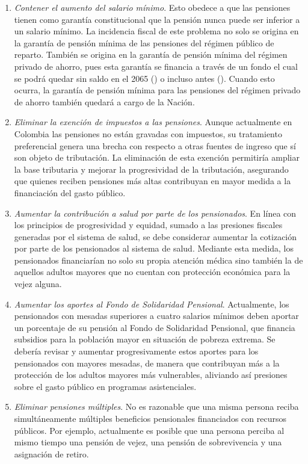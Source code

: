 \begin{enumerate}  
    \item \textit{Contener el aumento del salario mínimo}. Esto obedece a que las pensiones tienen como garantía constitucional que la pensión nunca puede ser inferior a un salario mínimo. La incidencia fiscal de este problema no solo se origina en la garantía de pensión mínima de las pensiones del régimen público de reparto. También se origina en la garantía de pensión mínima del régimen privado de ahorro, pues esta garantía se financia a través de un fondo el cual se podrá quedar sin saldo en el 2065 (\cite{Becerra2022}) o incluso antes (\cite{InformeFGPM2013}). Cuando esto ocurra, la garantía de pensión mínima para las pensiones del régimen privado de ahorro también quedará a cargo de la Nación.  
    
    \item \textit{Eliminar la exención de impuestos a las pensiones}. Aunque actualmente en Colombia las pensiones no están gravadas con impuestos, su tratamiento preferencial genera una brecha con respecto a otras fuentes de ingreso que sí son objeto de tributación. La eliminación de esta exención permitiría ampliar la base tributaria y mejorar la progresividad de la tributación, asegurando que quienes reciben pensiones más altas contribuyan en mayor medida a la financiación del gasto público.  
    
    \item \textit{Aumentar la contribución a salud por parte de los pensionados}. En línea con los principios de progresividad y equidad, sumado a las presiones fiscales generadas por el sistema de salud, se debe considerar aumentar la cotización por parte de los pensionados al sistema de salud. Mediante esta medida, los pensionados financiarían no solo su propia atención médica sino también la de aquellos adultos mayores que no cuentan con protección económica para la vejez alguna.

    \item \textit{Aumentar los aportes al Fondo de Solidaridad Pensional}. Actualmente, los pensionados con mesadas superiores a cuatro salarios mínimos deben aportar un porcentaje de su pensión al Fondo de Solidaridad Pensional, que financia subsidios para la población mayor en situación de pobreza extrema. Se debería revisar y aumentar progresivamente estos aportes para los pensionados con mayores mesadas, de manera que contribuyan más a la protección de los adultos mayores más vulnerables, aliviando así presiones sobre el gasto público en programas asistenciales.

    \item \textit{Eliminar pensiones múltiples}. No es razonable que una misma persona reciba simultáneamente múltiples beneficios pensionales financiados con recursos públicos. Por ejemplo, actualmente es posible que una persona perciba al mismo tiempo una pensión de vejez, una pensión de sobrevivencia y una asignación de retiro.

\end{enumerate}  


